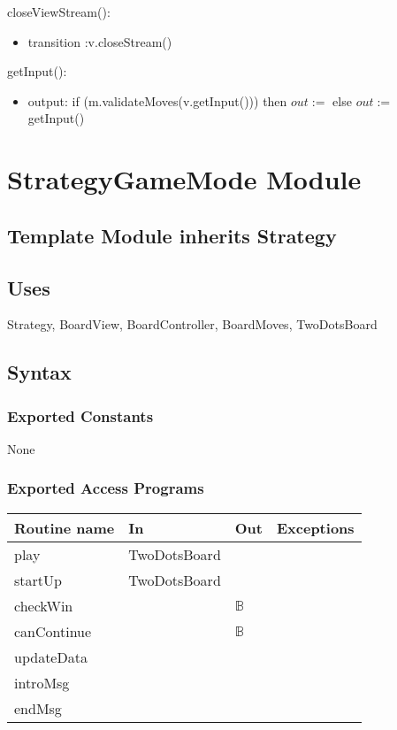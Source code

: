 \documentclass[12pt]{article}
\begin{document}
\noindent closeViewStream(): 
\begin{itemize}
\item transition :v.closeStream()
\end{itemize}


\noindent getInput(): 
\begin{itemize}
\item output: if (m.validateMoves(v.getInput())) then $out:=$ else $out :=$ getInput()
\end{itemize}


\newpage

\section* {StrategyGameMode Module}

\subsection* {Template Module inherits Strategy}


\subsection*{Uses}
Strategy, BoardView, BoardController, BoardMoves, TwoDotsBoard

\subsection* {Syntax}

\subsubsection* {Exported Constants}

None

\subsubsection* {Exported Access Programs}

\begin{tabular}{| l | l | l | p{6cm} |}
\hline
\textbf{Routine name} & \textbf{In} & \textbf{Out} & \textbf{Exceptions}\\
\hline
play & TwoDotsBoard & & \\
\hline
startUp & TwoDotsBoard & & \\
\hline
checkWin & & $\mathbb{B}$ & \\
\hline
canContinue &  & $\mathbb{B}$ & \\
\hline
updateData &  & & \\
\hline
introMsg & & & \\
\hline
endMsg & & & \\
\hline
\end{tabular}
\end{document}
